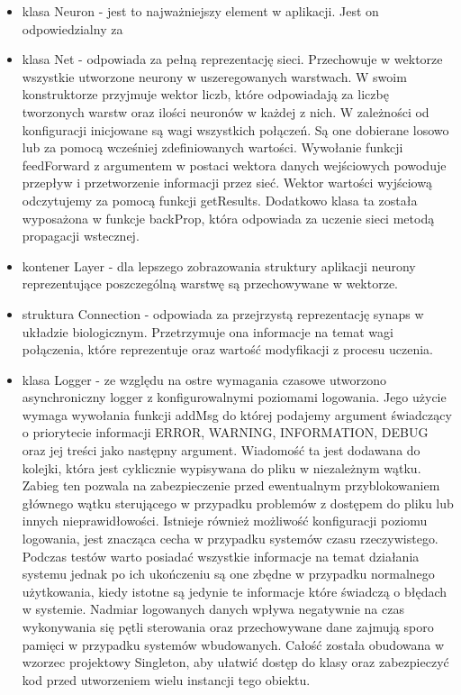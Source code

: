 \begin{itemize}
	\item klasa Neuron - jest to najważniejszy element w aplikacji. Jest on odpowiedzialny za 
	\item klasa Net - odpowiada za pełną reprezentację sieci. Przechowuje w wektorze wszystkie utworzone neurony w uszeregowanych warstwach. W swoim konstruktorze przyjmuje wektor liczb, które odpowiadają za liczbę tworzonych warstw oraz ilości neuronów w każdej z nich. W zależności od konfiguracji inicjowane są wagi wszystkich połączeń. Są one dobierane losowo lub za pomocą wcześniej zdefiniowanych wartości. Wywołanie funkcji feedForward z argumentem w postaci wektora danych wejściowych powoduje przepływ i przetworzenie informacji przez sieć. Wektor wartości wyjściową odczytujemy za pomocą funkcji getResults. Dodatkowo klasa ta została wyposażona w funkcje backProp, która odpowiada za uczenie sieci metodą propagacji wstecznej. 
	\item kontener Layer - dla lepszego zobrazowania struktury aplikacji neurony reprezentujące poszczególną warstwę są przechowywane w wektorze. 
	\item struktura Connection - odpowiada za przejrzystą reprezentację synaps w układzie biologicznym. Przetrzymuje ona informacje na temat wagi połączenia, które reprezentuje oraz wartość modyfikacji z procesu uczenia.
	\item klasa Logger - ze względu na ostre wymagania czasowe utworzono asynchroniczny logger z konfigurowalnymi poziomami logowania. Jego użycie wymaga wywołania funkcji addMsg do której podajemy argument świadczący o priorytecie informacji ERROR, WARNING, INFORMATION, DEBUG oraz jej treści jako następny argument. Wiadomość ta jest dodawana do kolejki, która jest cyklicznie wypisywana do pliku w niezależnym wątku. Zabieg ten pozwala na zabezpieczenie przed ewentualnym przyblokowaniem głównego wątku sterującego w przypadku problemów z dostępem do pliku lub innych nieprawidłowości. Istnieje również możliwość konfiguracji poziomu logowania, jest znacząca cecha w przypadku systemów czasu rzeczywistego. Podczas testów warto posiadać wszystkie informacje na temat działania systemu jednak po ich ukończeniu są one zbędne w przypadku normalnego użytkowania, kiedy istotne są jedynie te informacje które świadczą o błędach w systemie. Nadmiar logowanych danych wpływa negatywnie na czas wykonywania się pętli sterowania oraz przechowywane dane zajmują sporo pamięci w przypadku systemów wbudowanych.
	Całość została obudowana w wzorzec projektowy Singleton, aby ułatwić dostęp do klasy oraz zabezpieczyć kod przed utworzeniem wielu instancji tego obiektu.
\end{itemize}



